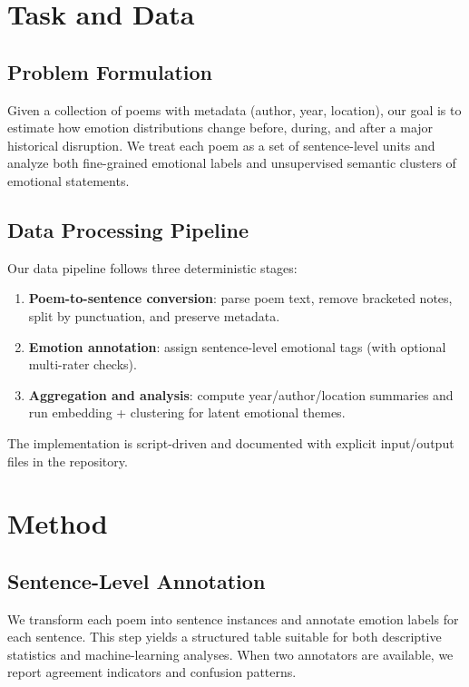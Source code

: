 \documentclass[11pt]{article}
\begin{document}
\section{Task and Data}

\subsection{Problem Formulation}

Given a collection of poems with metadata (author, year, location), our goal is to estimate how emotion distributions change before, during, and after a major historical disruption.
We treat each poem as a set of sentence-level units and analyze both fine-grained emotional labels and unsupervised semantic clusters of emotional statements.

\subsection{Data Processing Pipeline}

Our data pipeline follows three deterministic stages:

\begin{enumerate}
    \item \textbf{Poem-to-sentence conversion}: parse poem text, remove bracketed notes, split by punctuation, and preserve metadata.
    \item \textbf{Emotion annotation}: assign sentence-level emotional tags (with optional multi-rater checks).
    \item \textbf{Aggregation and analysis}: compute year/author/location summaries and run embedding + clustering for latent emotional themes.
\end{enumerate}

The implementation is script-driven and documented with explicit input/output files in the repository.

\section{Method}

\subsection{Sentence-Level Annotation}

We transform each poem into sentence instances and annotate emotion labels for each sentence.
This step yields a structured table suitable for both descriptive statistics and machine-learning analyses.
When two annotators are available, we report agreement indicators and confusion patterns.
\end{document}
